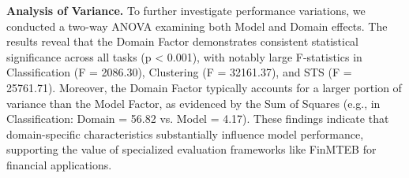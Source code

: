 \textbf{Analysis of Variance.} To further investigate performance variations, we conducted a two-way ANOVA examining both Model and Domain effects. The results reveal that the Domain Factor demonstrates consistent statistical significance across all tasks (p < 0.001), with notably large F-statistics in Classification (F = 2086.30), Clustering (F = 32161.37), and STS (F = 25761.71). Moreover, the Domain Factor typically accounts for a larger portion of variance than the Model Factor, as evidenced by the Sum of Squares (e.g., in Classification: Domain = 56.82 vs. Model = 4.17). These findings indicate that domain-specific characteristics substantially influence model performance, supporting the value of specialized evaluation frameworks like FinMTEB for financial applications.


